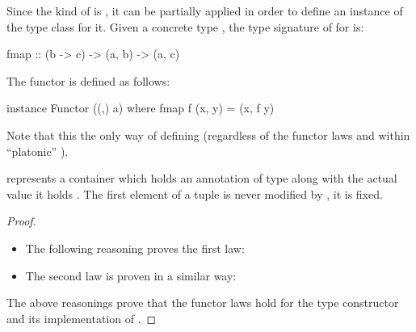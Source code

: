 \begin{example}
  \label{ex:functor-product-haskell}

  Since the kind of \texthaskell{(,)} is \texthaskell{* -> * -> *}, it can be
  partially applied in order to define an instance of the
   type class for it. Given a concrete type
  , the type signature of  for 
  is:
  \begin{codehaskell}
fmap :: (b -> c) -> (a, b) -> (a, c)
  \end{codehaskell}

  The  functor is defined as follows:
  \begin{codehaskell}
instance Functor ((,) a) where
  fmap f (x, y) = (x, f y)
  \end{codehaskell}
  Note that this the only way of defining  (regardless of
  the functor laws and within ``platonic'' \hask).

   represents a container which holds an annotation of
  type  along with the actual value it holds
  \parencite{yorgey-2009}. The first element of a tuple is never
  modified by , it is fixed.


  \begin{proof}

    \hfill
    \begin{itemize}
    \item
      The following reasoning proves the first law:
      \begin{steps}
      \end{steps}
    \item
      The second law is proven in a similar way:
      \begin{steps}
      \end{steps}
    \end{itemize}
    The above reasonings prove that the functor laws hold for the
     type constructor and its implementation of
    .

  \end{proof}

\end{example}

